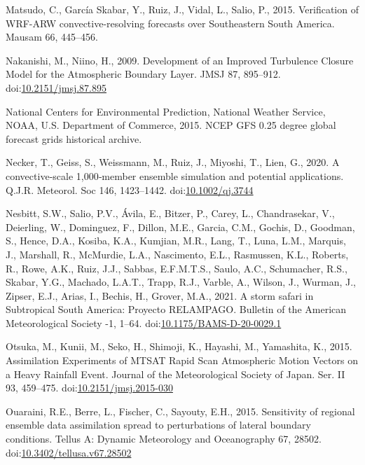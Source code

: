 \documentclass[final,5p,times,twocolumn,authoryear]{elsarticle} %
\begin{document}
\leavevmode\hypertarget{ref-matsudo2015}{}%
Matsudo, C., García Skabar, Y., Ruiz, J., Vidal, L., Salio, P., 2015. Verification of WRF-ARW convective-resolving forecasts over Southeastern South America. Mausam 66, 445--456.

\leavevmode\hypertarget{ref-nakanishi2009}{}%
Nakanishi, M., Niino, H., 2009. Development of an Improved Turbulence Closure Model for the Atmospheric Boundary Layer. JMSJ 87, 895--912. doi:\href{https://doi.org/10.2151/jmsj.87.895}{10.2151/jmsj.87.895}

\leavevmode\hypertarget{ref-cisl_rda_ds084.1}{}%
National Centers for Environmental Prediction, National Weather Service, NOAA, U.S. Department of Commerce, 2015. NCEP GFS 0.25 degree global forecast grids historical archive.

\leavevmode\hypertarget{ref-necker2020}{}%
Necker, T., Geiss, S., Weissmann, M., Ruiz, J., Miyoshi, T., Lien, G., 2020. A convective‐scale 1,000‐member ensemble simulation and potential applications. Q.J.R. Meteorol. Soc 146, 1423--1442. doi:\href{https://doi.org/10.1002/qj.3744}{10.1002/qj.3744}

\leavevmode\hypertarget{ref-nesbitt2021}{}%
Nesbitt, S.W., Salio, P.V., Ávila, E., Bitzer, P., Carey, L., Chandrasekar, V., Deierling, W., Dominguez, F., Dillon, M.E., Garcia, C.M., Gochis, D., Goodman, S., Hence, D.A., Kosiba, K.A., Kumjian, M.R., Lang, T., Luna, L.M., Marquis, J., Marshall, R., McMurdie, L.A., Nascimento, E.L., Rasmussen, K.L., Roberts, R., Rowe, A.K., Ruiz, J.J., Sabbas, E.F.M.T.S., Saulo, A.C., Schumacher, R.S., Skabar, Y.G., Machado, L.A.T., Trapp, R.J., Varble, A., Wilson, J., Wurman, J., Zipser, E.J., Arias, I., Bechis, H., Grover, M.A., 2021. A storm safari in Subtropical South America: Proyecto RELAMPAGO. Bulletin of the American Meteorological Society -1, 1--64. doi:\href{https://doi.org/10.1175/BAMS-D-20-0029.1}{10.1175/BAMS-D-20-0029.1}

\leavevmode\hypertarget{ref-otsuka2015}{}%
Otsuka, M., Kunii, M., Seko, H., Shimoji, K., Hayashi, M., Yamashita, K., 2015. Assimilation Experiments of MTSAT Rapid Scan Atmospheric Motion Vectors on a Heavy Rainfall Event. Journal of the Meteorological Society of Japan. Ser. II 93, 459--475. doi:\href{https://doi.org/10.2151/jmsj.2015-030}{10.2151/jmsj.2015-030}

\leavevmode\hypertarget{ref-ouaraini2015}{}%
Ouaraini, R.E., Berre, L., Fischer, C., Sayouty, E.H., 2015. Sensitivity of regional ensemble data assimilation spread to perturbations of lateral boundary conditions. Tellus A: Dynamic Meteorology and Oceanography 67, 28502. doi:\href{https://doi.org/10.3402/tellusa.v67.28502}{10.3402/tellusa.v67.28502}
\end{document}
